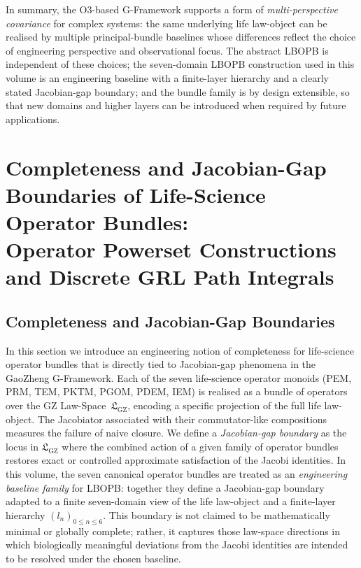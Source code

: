 \documentclass[11pt]{book}
\theoremstyle{plain}
\theoremstyle{definition}
\theoremstyle{remark}
\newcommand{\GZLS}{\ensuremath{\mathfrak{L}_{\mathrm{GZ}}}}       \newcommand{\GZLT}{\ensuremath{M_{!w}}}                           \newcommand{\GZLOC}{\ensuremath{A_M}}                             \newcommand{\GZLCurv}{\ensuremath{\mathcal{F}_{\mathrm{law}}}}
\begin{document}
In summary, the O3-based G-Framework supports a form of
\emph{multi-perspective covariance} for complex systems:
the same underlying life law-object can be realised by multiple
principal-bundle baselines whose differences reflect the choice of
engineering perspective and observational focus.
The abstract LBOPB is independent of these choices;
the seven-domain LBOPB construction used in this volume is an
engineering baseline with a finite-layer hierarchy and a clearly stated
Jacobian-gap boundary; and the bundle family is by design extensible,
so that new domains and higher layers can be introduced when required by
future applications.



\chapter[Completeness and Jacobian-Gap Boundaries of Life-Science Operator Bundles]{Completeness and Jacobian-Gap Boundaries of Life-Science Operator Bundles:\\
         Operator Powerset Constructions and Discrete GRL Path Integrals}


\section{Completeness and Jacobian-Gap Boundaries}


In this section we introduce an engineering notion of completeness for
life-science operator bundles that is directly tied to Jacobian-gap
phenomena in the GaoZheng G-Framework. Each of the seven life-science
operator monoids (PEM, PRM, TEM, PKTM, PGOM, PDEM, IEM) is realised as
a bundle of operators over the GZ Law-Space~$\GZLS$, encoding a specific
projection of the full life law-object. The Jacobiator associated with
their commutator-like compositions measures the failure of naive
closure. We define a \emph{Jacobian-gap boundary} as the locus in
$\GZLS$ where the combined action of a given family of operator bundles
restores exact or controlled approximate satisfaction of the Jacobi
identities. In this volume, the seven canonical operator bundles are
treated as an \emph{engineering baseline family} for LBOPB: together
they define a Jacobian-gap boundary adapted to a finite seven-domain
view of the life law-object and a finite-layer hierarchy
$(l_n)_{0\le n\le 6}$. This boundary is not claimed to be mathematically
minimal or globally complete; rather, it captures those law-space
directions in which biologically meaningful deviations from the Jacobi
identities are intended to be resolved under the chosen baseline.
\end{document}
